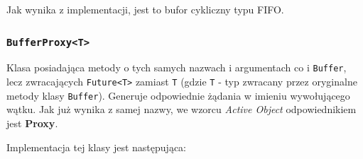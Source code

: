 \documentclass[11pt]{article}
\begin{document}
Jak wynika z implementacji, jest to bufor cykliczny typu FIFO.

    \hypertarget{bufferproxyt}{%
\subsubsection{\texorpdfstring{\texttt{BufferProxy\textless{}T\textgreater{}}}{BufferProxy\textless T\textgreater{}}}\label{bufferproxyt}}

Klasa posiadająca metody o tych samych nazwach i argumentach co i
\texttt{Buffer}, lecz zwracających
\texttt{Future\textless{}T\textgreater{}} zamiast \texttt{T} (gdzie
\texttt{T} - typ zwracany przez oryginalne metody klasy
\texttt{Buffer}). Generuje odpowiednie żądania w imieniu wywołującego
wątku. Jak już wynika z samej nazwy, we wzorcu \emph{Active Object}
odpowiednikiem jest \textbf{Proxy}.

Implementacja tej klasy jest następująca:
\end{document}
